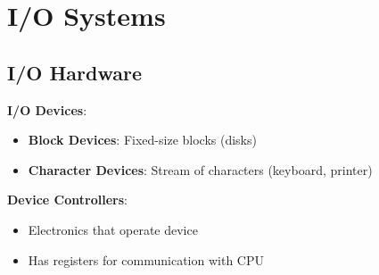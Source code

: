 \documentclass[12pt,a4paper]{report}
\begin{document}
\section{I/O Systems}

\subsection{I/O Hardware}
\begin{concept}
\textbf{I/O Devices}:
\begin{itemize}
    \item \textbf{Block Devices}: Fixed-size blocks (disks)
    \item \textbf{Character Devices}: Stream of characters (keyboard, printer)
\end{itemize}

\textbf{Device Controllers}:
\begin{itemize}
    \item Electronics that operate device
    \item Has registers for communication with CPU
\end{itemize}
\end{concept}
\end{document}
